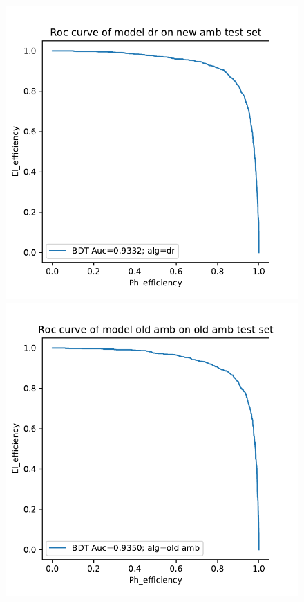 \documentclass[a4paper, oneside]{book}
\begin{document}
\begin{figure}[ht]
\begin{minipage}[b]{0.5\linewidth}
					\caption{}
					\label{fig:dr_old} 
					\vspace{4ex}
				\end{minipage} 
				\begin{minipage}[b]{0.5\linewidth}
					\centering
					\includegraphics[width=1.\linewidth]{tesi_images/dr_new.pdf} 
					\caption{} 
					\label{fig:dr_new}
					\vspace{4ex}
				\end{minipage}%
				\begin{minipage}[b]{0.5\linewidth}
					\centering
					\includegraphics[width=1.\linewidth]{tesi_images/old_old.pdf} 
					\caption{} 
					\label{fig:old_old}
					\vspace{4ex}
				\end{minipage}
			\end{figure}
\end{document}

